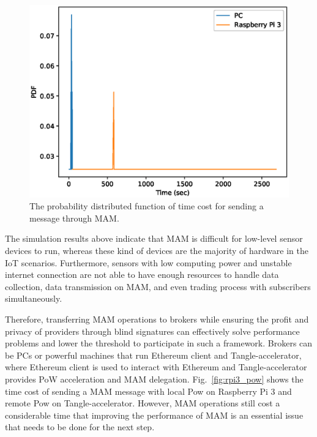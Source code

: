 \begin{spacing}{2.0}
\begin{figure}[H]
    \centering
    \includegraphics[width=5.in]{img/mam_send}
    \caption{The probability distributed function of time cost for sending a message through MAM.}
    \label{fig:mam_send}
\end{figure}

The simulation results above indicate that MAM is difficult for low-level sensor devices to run, whereas these kind of devices are the majority of hardware in the IoT scenarios. Furthermore, sensors with low computing power and unstable internet connection are not able to have enough resources to handle data collection, data transmission on MAM, and even trading process with subscribers simultaneously.

Therefore, transferring MAM operations to brokers while ensuring the profit and privacy of providers through blind signatures can effectively solve performance problems and lower the threshold to participate in such a framework. Brokers can be PCs or powerful machines that run Ethereum client and Tangle-accelerator, where Ethereum client is used to interact with Ethereum and Tangle-accelerator provides PoW acceleration and MAM delegation. Fig.~\ref{fig:rpi3_pow} shows the time cost of sending a MAM message with local Pow on Raspberry Pi 3 and remote Pow on Tangle-accelerator. However, MAM operations still cost a considerable time that improving the performance of MAM is an essential issue that needs to be done for the next step.


\end{spacing}
